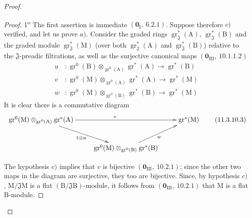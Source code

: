 \begin{proof}
\begin{proof}
1\textsuperscript{o} The first assertion is immediate $(\mathbf{0}_\mathrm{I},~6.2.1)$. Suppose therefore $c)$ verified, and let us prove $a)$. Consider the graded rings $\operatorname{gr}^*_\mathfrak{J}(\mathrm{A})$, $\operatorname{gr}^*_\mathfrak{J}(\mathrm{B})$ and the graded module $\operatorname{gr}^*_\mathfrak{J}(\mathrm{M})$ (over both $\operatorname{gr}^*_\mathfrak{J}(\mathrm{A})$ and $\operatorname{gr}^*_\mathfrak{J}(\mathrm{B})$) relative to the $\mathfrak{J}$-preadic filtrations, as well as the surjective canonical maps $(\mathbf{0}_{\mathrm{III}},~10.1.1.2)$
\begin{align*}
  u &: \operatorname{gr}^0(\mathrm{B})\otimes_{\operatorname{gr}^0(\mathrm{A})}\operatorname{gr}^*(\mathrm{A})\to\operatorname{gr}^*(\mathrm{B}) \\
  v &: \operatorname{gr}^0(\mathrm{M})\otimes_{\operatorname{gr}^0(\mathrm{A})}\operatorname{gr}^*(\mathrm{A})\to\operatorname{gr}^*(\mathrm{M}) \\
  w &: \operatorname{gr}^0(\mathrm{M})\otimes_{\operatorname{gr}^0(\mathrm{B})}\operatorname{gr}^*(\mathrm{B})\to\operatorname{gr}^*(\mathrm{M})
\end{align*}
It is clear there is a commutative diagram
\begin{equation}
\xymatrix{
  \operatorname{gr}^0(\mathrm{M})\otimes_{\operatorname{gr}^0(\mathrm{A})}\operatorname{gr}^*(\mathrm{A}) \ar[rr]^{v} \ar[dr]_{1\otimes u} & & \operatorname{gr}^*(\mathrm{M}) \\
  & \operatorname{gr}^0(\mathrm{M})\otimes_{\operatorname{gr}^0(\mathrm{B})}\operatorname{gr}^*(\mathrm{B}) \ar[ur]_{w} &
}
  \tag{11.3.10.3}
\end{equation}

The hypothesis $c)$ implies that $v$ is bijective $(\mathbf{0}_{\mathrm{III}},~10.2.1)$; since the other two maps in the diagram are surjective, they too are bijective. Since, by hypothesis $c)$, $\mathrm{M}/\mathfrak{J}\mathrm{M}$ is a flat $(\mathrm{B}/\mathfrak{J}\mathrm{B})$-module, it follows from $(\mathbf{0}_{\mathrm{III}},~10.2.1)$ that $\mathrm{M}$ is a flat $\mathrm{B}$-module.


\end{proof}
\end{proof}
